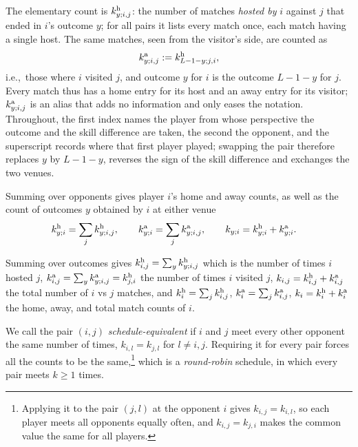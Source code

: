 \documentclass[letterpaper,12pt]{article}
\newcommand{\tnr}[1]{{\textnormal{#1}}}
\newcommand{\ie}{i.e.,~} 		%
\begin{document}
The elementary count is $k^\tnr{h}_{y;i,j}$: the number of matches \emph{hosted by} $i$ against $j$ that ended in $i$'s outcome $y$; for all pairs it lists every match once, each match having a single host. The same matches, seen from the visitor's side, are counted as
\begin{align}
\label{k.a.def}
    k^\tnr{a}_{y;i,j}:=k^\tnr{h}_{L-1-y;j,i},
\end{align}
\ie those where $i$ visited $j$, and outcome $y$ for $i$ is the outcome $L-1-y$ for $j$. Every match thus has a home entry for its host and an away entry for its visitor; $k^\tnr{a}_{y;i,j}$ is an alias that adds no information and only eases the notation. Throughout, the first index names the player from whose perspective the outcome and the skill difference are taken, the second the opponent, and the superscript records where that first player played; swapping the pair therefore replaces $y$ by $L-1-y$, reverses the sign of the skill difference and exchanges the two venues.

Summing over opponents gives player $i$'s home and away counts, as well as the count of outcomes $y$ obtained by $i$ at either venue
\begin{align}
\label{player.records}
    k^\tnr{h}_{y;i}&=\sum_j k^\tnr{h}_{y;i,j},\qquad
    k^\tnr{a}_{y;i}=\sum_j k^\tnr{a}_{y;i,j},\qquad
    k_{y;i}=k^\tnr{h}_{y;i}+k^\tnr{a}_{y;i}.
\end{align}

Summing over outcomes gives $k^\tnr{h}_{i,j}=\sum_y k^\tnr{h}_{y;i,j}$ which is the number of times $i$ hosted $j$, $k^\tnr{a}_{i,j}=\sum_y k^\tnr{a}_{y;i,j}=k^\tnr{h}_{j,i}$ the number of times $i$ visited $j$, $k_{i,j}=k^\tnr{h}_{i,j}+k^\tnr{a}_{i,j}$ the total number of $i$ vs $j$ matches, and $k^\tnr{h}_i=\sum_j k^\tnr{h}_{i,j}$, $k^\tnr{a}_i=\sum_j k^\tnr{a}_{i,j}$, $k_i=k^\tnr{h}_i+k^\tnr{a}_i$ the home, away, and total match counts of $i$.

We call the pair $(i,j)$ \emph{schedule-equivalent} if $i$ and $j$ meet every other opponent the same number of times, $k_{i,l}=k_{j,l}$ for $l\ne i,j$. %
Requiring it for every pair forces all the counts to be the same,\footnote{Applying it to the pair $(j,l)$ at the opponent $i$ gives $k_{i,j}=k_{i,l}$, so each player meets all opponents equally often, and $k_{i,j}=k_{j,i}$ makes the common value the same for all players.} which is a \emph{round-robin} schedule, in which every pair meets $k\ge1$ times.
\end{document}
